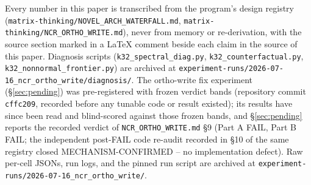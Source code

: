 \documentclass{article} %
\begin{document}
Every number in this paper is transcribed from the program's design
registry (\texttt{matrix-thinking/NOVEL\_ARCH\_WATERFALL.md},
\texttt{matrix-thinking/NCR\_ORTHO\_WRITE.md}), never from memory or
re-derivation, with the source section marked in a LaTeX comment beside
each claim in the source of this paper. Diagnosis scripts
(\texttt{k32\_spectral\_diag.py}, \texttt{k32\_counterfactual.py},
\texttt{k32\_nonnormal\_frontier.py}) are archived at
\texttt{experiment-runs/2026-07-16\_ncr\_ortho\_write/diagnosis/}. The
ortho-write fix experiment (\S\ref{sec:pending}) was pre-registered with
frozen verdict bands (repository commit \texttt{cffc209}, recorded before
any tunable code or result existed); its results have since been read and
blind-scored against those frozen bands, and \S\ref{sec:pending} reports
the recorded verdict of \texttt{NCR\_ORTHO\_WRITE.md} \S9 (Part A FAIL,
Part B FAIL; the independent post-FAIL code re-audit recorded in \S10 of
the same registry closed MECHANISM-CONFIRMED -- no implementation
defect). Raw per-cell JSONs, run logs, and the pinned run script are
archived at
\texttt{experiment-runs/2026-07-16\_ncr\_ortho\_write/}.
\end{document}
